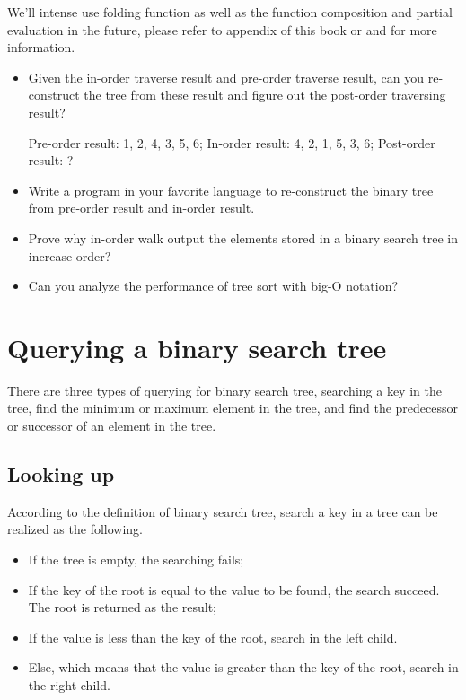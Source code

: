 \documentclass{article}
\begin{document}
We'll intense use folding function as well as the function composition
and partial evaluation in the future, please refer to appendix of this
book or \cite{wiki-fold}
\cite{func-composition} and \cite{curry} for more information.

\begin{Exercise}

\begin{itemize}
\item Given the in-order traverse result and pre-order traverse result,
can you re-construct the tree from these result and figure out the
post-order traversing result?

Pre-order result: 1, 2, 4, 3, 5, 6;
In-order result: 4, 2, 1, 5, 3, 6;
Post-order result: ?

\item Write a program in your favorite language to re-construct
the binary tree from pre-order result and in-order result.

\item Prove why in-order walk output the elements stored in a binary
search tree in increase order?

\item Can you analyze the performance of tree sort with big-O notation?
\end{itemize}
\end{Exercise}

\section{Querying a binary search tree}

There are three types of querying for binary search tree, searching
a key in the tree, find the minimum or maximum element in the tree,
and find the predecessor or successor of an element in the tree.

\subsection{Looking up}
According to the definition of binary search tree, search
a key in a tree can be realized as the following.

\begin{itemize}
\item If the tree is empty, the searching fails;
\item If the key of the root is equal to the value to be found, the
search succeed. The root is returned as the result;
\item If the value is less than the key of the root, search in the left
child.
\item Else, which means that the value is greater than the key of the
root, search in the right child.
\end{itemize}
\end{document}
